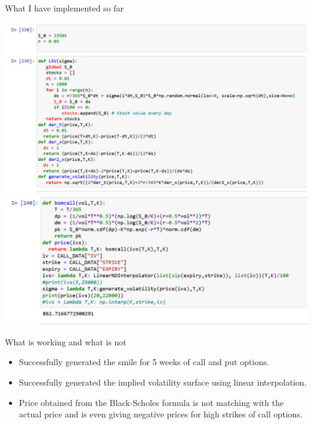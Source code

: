 \documentclass{beamer}
\begin{document}
\begin{frame}{What I have implemented so far}
    \begin{center}
    \includegraphics[scale = 0.25]{model_surface}
    \includegraphics[scale = 0.25]{IVS}
    \end{center}
\end{frame}
\begin{frame}{What is working and what is not}
\begin{itemize}
    \item Successfully generated the smile for 5 weeks of call and put options.
    \item Successfully generated the implied volatility surface using linear interpolation.
    \item Price obtained from the Black-Scholes formula is not matching with the actual price and is even giving negative prices for high strikes of call options.
\end{itemize}
\end{frame}
\end{document}
